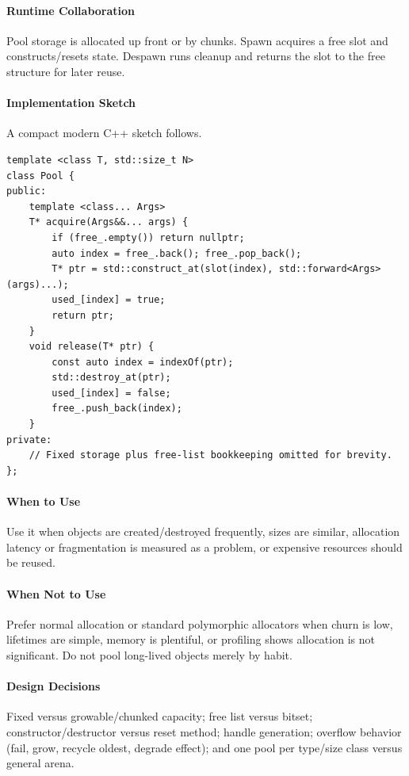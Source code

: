 \documentclass[11pt]{article}
\begin{document}
\paragraph{Runtime Collaboration} Pool storage is allocated up front or by chunks. Spawn acquires a free slot and constructs/resets state. Despawn runs cleanup and returns the slot to the free structure for later reuse.
\paragraph{Implementation Sketch} A compact modern C++ sketch follows.
\begin{lstlisting}
template <class T, std::size_t N>
class Pool {
public:
    template <class... Args>
    T* acquire(Args&&... args) {
        if (free_.empty()) return nullptr;
        auto index = free_.back(); free_.pop_back();
        T* ptr = std::construct_at(slot(index), std::forward<Args>(args)...);
        used_[index] = true;
        return ptr;
    }
    void release(T* ptr) {
        const auto index = indexOf(ptr);
        std::destroy_at(ptr);
        used_[index] = false;
        free_.push_back(index);
    }
private:
    // Fixed storage plus free-list bookkeeping omitted for brevity.
};
\end{lstlisting}
\paragraph{When to Use} Use it when objects are created/destroyed frequently, sizes are similar, allocation latency or fragmentation is measured as a problem, or expensive resources should be reused.
\paragraph{When Not to Use} Prefer normal allocation or standard polymorphic allocators when churn is low, lifetimes are simple, memory is plentiful, or profiling shows allocation is not significant. Do not pool long-lived objects merely by habit.
\paragraph{Design Decisions} Fixed versus growable/chunked capacity; free list versus bitset; constructor/destructor versus reset method; handle generation; overflow behavior (fail, grow, recycle oldest, degrade effect); and one pool per type/size class versus general arena.
\end{document}

